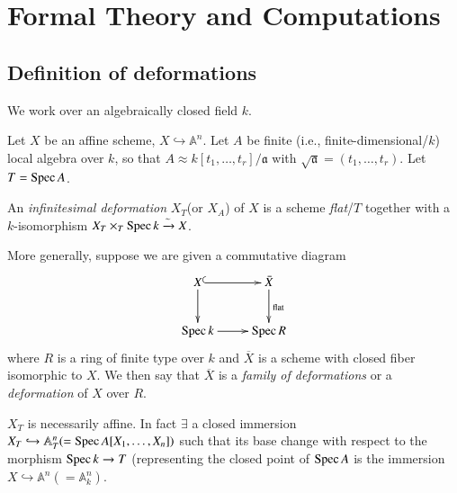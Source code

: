 
\makeatletter
\def\@makechapterhead#1{%
  \centerline{{\fontsize{13pt}{13pt}\selectfont\underline{\LARGE\bf Deformations of Singularities}}}
  \vspace*{30\p@}%
  {\parindent \z@ \raggedright \normalfont
    \ifnum \c@secnumdepth >\m@ne
      \if@mainmatter
        \huge\bfseries Part\space \thechapter
       \par\nobreak
        \vskip 20\p@
      \fi
    \fi
    \interlinepenalty\@M
    \Huge \bfseries #1 \par\nobreak
    \vskip 40\p@
  }}
\makeatother

\chapter{Formal Theory and Computations}\label{part1}

\section{Definition of deformations}\label{part1-sec1}\pageoriginale

We work over an algebraically closed field $k$.

Let $X$ be an affine scheme, $X\hookrightarrow\mathbb{A}^{n}$. Let $A$
be finite (i.e., finite-dimensional/$k$) local algebra over $k$, so that
$A\approx k[t_{1},\ldots,t_{r}]/\mathfrak{a}$ with
$\sqrt{\mathfrak{a}}=(t_{1},\ldots,t_{r})$. Let $T=\operatorname{Spec} A$.

\begin{definition}\label{part1-defi1.1}%
An {\em infinitesimal deformation} $X_{T}$(or $X_{A}$) of $X$ is a
scheme {\em flat}/$T$ together with a $k$-isomorphism
$X_{T}\times_{T}\operatorname{Spec} k \xrightarrow{\sim} X$.
\end{definition}

More generally, suppose we are given a commutative diagram
\[
\xymatrix{
X\ar[d]\ar@{^{(}->}[r]&\bar{X}\ar[d]^{\text{flat}}\\
\Spec k\ar[r]& \Spec R
}\]
where $R$ is a ring of finite type over $k$ and $\overline{X}$ is a scheme with closed fiber isomorphic to $X$. We then say that $\overline{X}$  is a {\em family of deformations} or a {\em deformation} of $X$ over $R$.

\begin{remark}\label{part1-rem1.1}%
$X_{T}$ is necessarily affine. In fact $\exists$ a closed immersion $X_{T}\hookrightarrow\mathbb{A}^{n}_{T}(=\operatorname{Spec} A[X_{1},\ldots,X_{n}])$ such that its base change with respect to the morphism $\operatorname{Spec} k\rightarrow T$ (representing the closed point of $\operatorname{Spec} A$ is the immersion $X\hookrightarrow\mathbb{A}^{n}(=\mathbb{A}_{k}^{n})$.
\end{remark}

